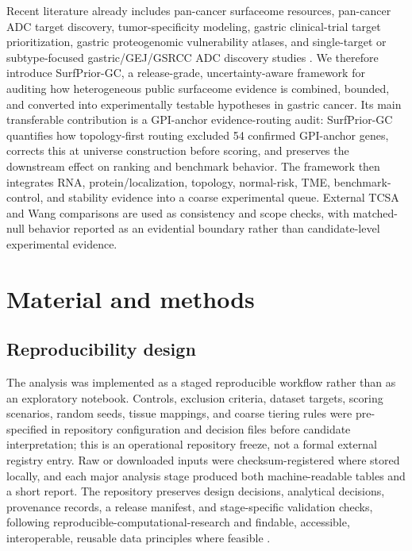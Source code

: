 \documentclass[review,12pt,authoryear]{elsarticle}
\begin{document}
Recent literature already includes pan-cancer surfaceome resources, pan-cancer ADC target discovery, tumor-specificity modeling, gastric clinical-trial target prioritization, gastric proteogenomic vulnerability atlases, and single-target or subtype-focused gastric/\allowbreak{}GEJ/\allowbreak{}GSRCC ADC discovery studies \citep{hu2021surfaceome,li2022pancancer,razzaghdoust2021adc,kathad2024adc,wang2026gastric,deng2024multiomics2targets,moek2017adc_landscape,li2024bayests,xu2025gastric_targets,chang2026gastric_proteogenomics,zhang2025cd66c,zhao2026pvr,li2026gastric_adc_review,katoh2025adhesion_adc,wang2025cdh17_adc}. We therefore introduce SurfPrior-GC, a release-grade, uncertainty-aware framework for auditing how heterogeneous public surfaceome evidence is combined, bounded, and converted into experimentally testable hypotheses in gastric cancer. Its main transferable contribution is a GPI-anchor evidence-routing audit: SurfPrior-GC quantifies how topology-first routing excluded 54 confirmed GPI-anchor genes, corrects this at universe construction before scoring, and preserves the downstream effect on ranking and benchmark behavior. The framework then integrates RNA, protein/\allowbreak{}localization, topology, normal-risk, TME, benchmark-control, and stability evidence into a coarse experimental queue. External TCSA and Wang comparisons are used as consistency and scope checks, with matched-null behavior reported as an evidential boundary rather than candidate-level experimental evidence.

\FloatBarrier
\section{Material and methods}

\subsection{Reproducibility design}

The analysis was implemented as a staged reproducible workflow rather than as an exploratory notebook. Controls, exclusion criteria, dataset targets, scoring scenarios, random seeds, tissue mappings, and coarse tiering rules were pre-specified in repository configuration and decision files before candidate interpretation;\allowbreak{} this is an operational repository freeze, not a formal external registry entry. Raw or downloaded inputs were checksum-registered where stored locally, and each major analysis stage produced both machine-readable tables and a short report. The repository preserves design decisions, analytical decisions, provenance records, a release manifest, and stage-specific validation checks, following reproducible-computational-research and findable, accessible, interoperable, reusable data principles where feasible \citep{sandve2013reproducible,wilkinson2016fair}.
\end{document}
